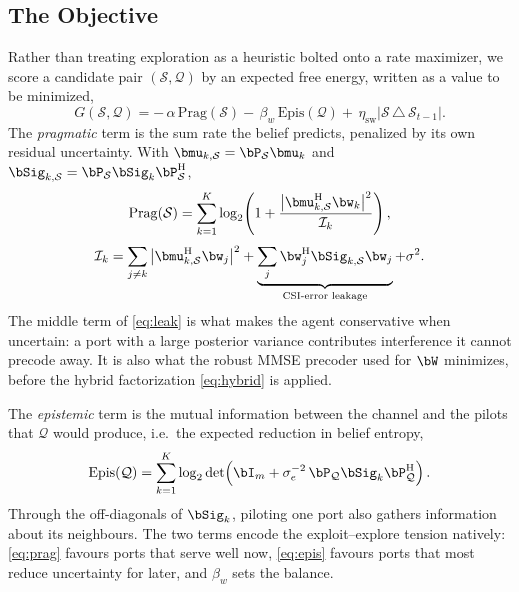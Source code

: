 \subsection{The Objective}
Rather than treating exploration as a heuristic bolted onto a rate maximizer,
we score a candidate pair $(\mathcal{S},\mathcal{Q})$ by an expected free
energy, written as a value to be minimized,
\begin{equation}
  G(\mathcal{S},\mathcal{Q}) =
   -\,\alpha\,\mathrm{Prag}(\mathcal{S})
   -\,\beta_w\,\mathrm{Epis}(\mathcal{Q})
   +\,\eta_{\mathrm{sw}}\big|\mathcal{S}\,\triangle\,\mathcal{S}_{t-1}\big| .
  \label{eq:efe}
\end{equation}
The \emph{pragmatic} term is the sum rate the belief predicts, penalized by its
own residual uncertainty. With $\bmu_{k,\mathcal{S}}=\bP_{\mathcal{S}}\bmu_k$
and $\bSig_{k,\mathcal{S}}=\bP_{\mathcal{S}}\bSig_k\bP_{\mathcal{S}}^{\mathrm{H}}$,
\begin{equation}
  \mathrm{Prag}(\mathcal{S}) = \sum_{k=1}^{K}
    \log_2\!\left(1+
    \frac{\big|\bmu_{k,\mathcal{S}}^{\mathrm{H}}\bw_k\big|^2}{\mathcal{I}_k}
    \right),
  \label{eq:prag}
\end{equation}
\begin{equation}
  \mathcal{I}_k =
    \sum_{j\neq k}\big|\bmu_{k,\mathcal{S}}^{\mathrm{H}}\bw_j\big|^2
    + \underbrace{\sum_{j}\bw_j^{\mathrm{H}}\bSig_{k,\mathcal{S}}\bw_j}
      _{\text{CSI-error leakage}}
    + \sigma^2 .
  \label{eq:leak}
\end{equation}
The middle term of \eqref{eq:leak} is what makes the agent conservative when
uncertain: a port with a large posterior variance contributes interference it
cannot precode away. It is also what the robust MMSE precoder used for $\bW$
minimizes, before the hybrid factorization \eqref{eq:hybrid} is applied.

The \emph{epistemic} term is the mutual information between the channel and the
pilots that $\mathcal{Q}$ would produce, i.e.\ the expected reduction in belief
entropy,
\begin{equation}
  \mathrm{Epis}(\mathcal{Q}) = \sum_{k=1}^{K}
    \log_2\det\!\left(\bI_{m}
      + \sigma_e^{-2}\,
      \bP_{\mathcal{Q}}\bSig_k\bP_{\mathcal{Q}}^{\mathrm{H}}\right).
  \label{eq:epis}
\end{equation}
Through the off-diagonals of $\bSig_k$, piloting one port also gathers
information about its neighbours. The two terms encode the exploit--explore
tension natively: \eqref{eq:prag} favours ports that serve well now,
\eqref{eq:epis} favours ports that most reduce uncertainty for later, and
$\beta_w$ sets the balance.

